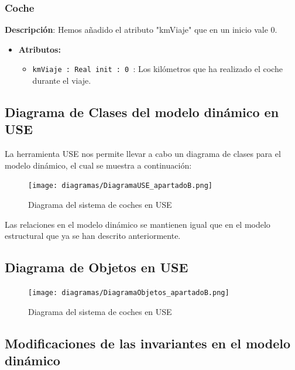 \documentclass[12pt.a4paper]{article}
\begin{document}
\subsubsection{Coche}
\textbf{Descripción}:  Hemos añadido el atributo "kmViaje" que en un inicio vale 0.
\begin{itemize}
    \item \textbf{Atributos:}
    \begin{itemize}
        \item \texttt{kmViaje : Real init : 0 }: Los kilómetros que ha realizado el coche durante el viaje.
    \end{itemize}
\end{itemize}

\subsection{Diagrama de Clases del modelo dinámico en USE}
La herramienta USE nos permite llevar a cabo un diagrama de clases para el modelo dinámico, el cual se muestra a continuación:
\begin{figure}[H]
     \texttt{[image: diagramas/DiagramaUSE\_apartadoB.png]}
     \caption{Diagrama del sistema de coches en USE}
     \label{Diagrama del sistema de coches en USE}
\end{figure}

Las relaciones en el modelo dinámico se mantienen igual que en el modelo estructural que ya se han descrito anteriormente.

\subsection{Diagrama de Objetos en USE}

\vspace{2.0cm}

\begin{figure}[H]
     \texttt{[image: diagramas/DiagramaObjetos\_apartadoB.png]}
     \caption{Diagrama del sistema de coches en USE}
     \label{Diagrama del sistema de coches en USE}
\end{figure}

\subsection{Modificaciones de las invariantes en el modelo dinámico}
\end{document}
